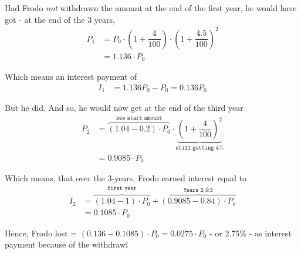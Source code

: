 \begin{solution}[\fullpage]
	Had Frodo \textit{not} withdrawn the amount at the end of the first year, he would have
	 got - at the end of the 3 years,
	\begin{align}
		P_1 &= P_0\cdot\left(1+\dfrac{4}{100}\right)\cdot\left(1+\dfrac{4.5}{100}\right)^{2} \\
		    &= 1.136\cdot P_0
	\end{align}
	
	Which means an interest payment of
	\begin{align}
		I_1 &= 1.136 P_0 - P_0 = 0.136 P_0
	\end{align}
	
	But he did. And so, he would now get at the end of the third year
	\begin{align}
		P_2 &= \overbrace{(1.04-0.2)\cdot P_0}^{\texttt{new start amount}}\cdot
		\underbrace{\left( 1 + \dfrac{4}{100}\right)^2}_{\texttt{still getting 4\%}} \\
		&= 0.9085\cdot P_0
	\end{align}
	
	Which means, that over the 3-years, Frodo earned interest equal to
	\begin{align}
		I_2 &= \overbrace{(1.04 - 1)\cdot P_0}^{\texttt{first year}} + 
		       \overbrace{(0.9085 - 0.84)\cdot P_0}^{\texttt{Years 2 \& 3}} \\
		    &= 	0.1085\cdot P_0
	\end{align}
	
	Hence, Frodo lost = $(0.136 - 0.1085)\cdot P_0 = 0.0275\cdot P_0$ - or 2.75\% - as interest 
	payment because of the withdrawl
	
\end{solution}
